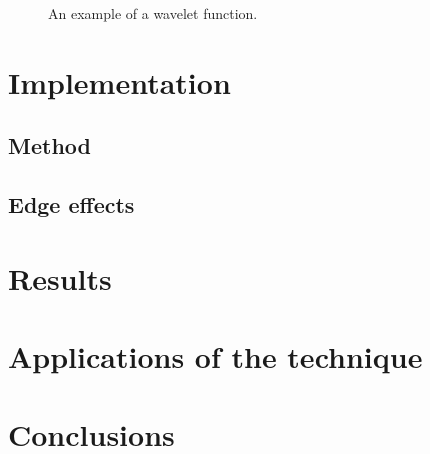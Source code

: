 \documentclass[11pt]{article}
\begin{document}
\begin{figure}
\vspace{7.0cm}
\caption{An example of a wavelet function.}
\label{fig-wavelet}
\end{figure}



\section{Implementation}

\subsection{Method}

\subsection{Edge effects}


\section{Results}

\section{Applications of the technique}

\section{Conclusions}
\end{document}
